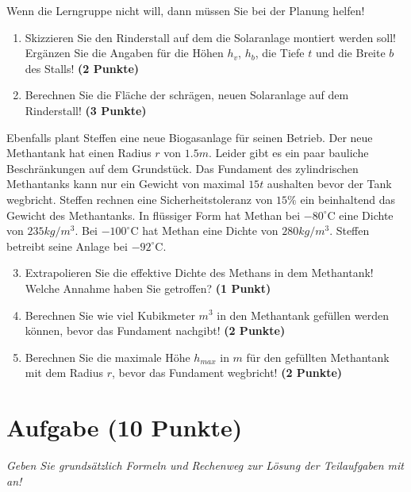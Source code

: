 \documentclass[a4paper, 9pt]{scrartcl}\usepackage[]{graphicx}\usepackage[]{xcolor}
\begin{document}
\vspace{1Ex}

Wenn die Lerngruppe nicht will, dann müssen Sie bei der Planung helfen!

\begin{enumerate}
\item Skizzieren Sie den Rinderstall auf dem die Solaranlage montiert werden soll! Ergänzen Sie die Angaben für die Höhen $h_v$, $h_b$, die Tiefe $t$ und die Breite $b$ des Stalls!  \textbf{(2 Punkte)}
\item Berechnen Sie die Fläche der schrägen, neuen Solaranlage auf dem Rinderstall! \textbf{(3 Punkte)}
\end{enumerate}

Ebenfalls plant Steffen eine neue Biogasanlage für seinen Betrieb. Der neue Methantank hat einen Radius $r$ von $1.5m$. Leider gibt es ein paar bauliche Beschränkungen auf dem Grundstück. Das Fundament des zylindrischen Methantanks kann nur ein Gewicht von maximal $15t$ aushalten bevor der Tank wegbricht. Steffen rechnen eine Sicherheitstoleranz von $15\%$ ein beinhaltend das Gewicht des Methantanks. In flüssiger Form hat Methan bei $-80^\circ\text{C}$ eine Dichte von $235kg/m^3$. Bei $-100^\circ\text{C}$ hat Methan eine Dichte von $280kg/m^3$. Steffen betreibt seine Anlage bei $-92^\circ\text{C}$.

\begin{enumerate}
  \setcounter{enumi}{2}
\item Extrapolieren Sie die effektive Dichte des Methans in dem Methantank! Welche Annahme haben Sie getroffen? \textbf{(1 Punkt)}
\item Berechnen Sie wie viel Kubikmeter $m^3$ in den Methantank gefüllen werden können, bevor das Fundament nachgibt! \textbf{(2 Punkte)}
\item Berechnen Sie die maximale Höhe $h_{max}$ in $m$ für den gefüllten Methantank mit dem Radius $r$, bevor das Fundament wegbricht! \textbf{(2 Punkte)}
\end{enumerate}

 
\clearpage

\section{Aufgabe \hfill (10 Punkte)}

\textit{Geben Sie grundsätzlich Formeln und Rechenweg zur Lösung der Teilaufgaben mit an!} \\[1Ex]
 
\end{document}
